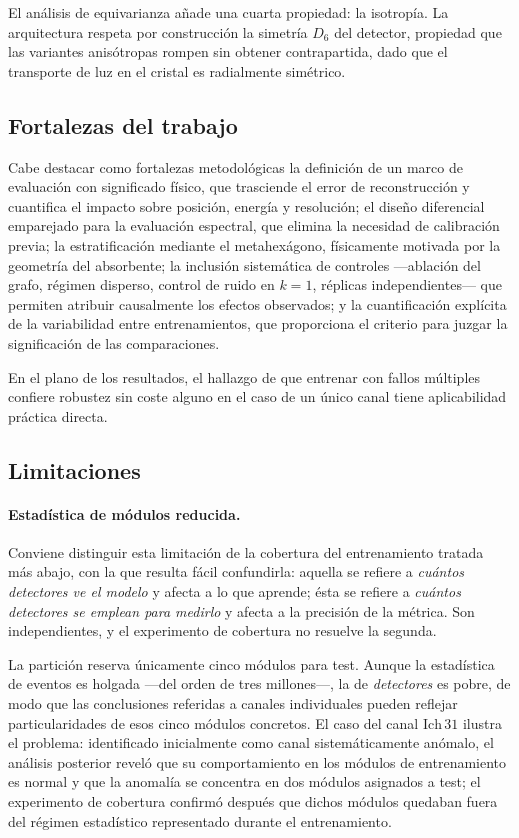 El análisis de equivarianza añade una cuarta propiedad: la isotropía. La arquitectura respeta por
construcción la simetría $D_6$ del detector, propiedad que las variantes anisótropas rompen sin
obtener contrapartida, dado que el transporte de luz en el cristal es radialmente simétrico.

\subsection{Fortalezas del trabajo}

Cabe destacar como fortalezas metodológicas la definición de un marco de evaluación con significado
físico, que trasciende el error de reconstrucción y cuantifica el impacto sobre posición, energía y
resolución; el diseño diferencial emparejado para la evaluación espectral, que elimina la necesidad
de calibración previa; la estratificación mediante el metahexágono, físicamente motivada por la
geometría del absorbente; la inclusión sistemática de controles ---ablación del grafo, régimen
disperso, control de ruido en $k=1$, réplicas independientes--- que permiten atribuir causalmente los
efectos observados; y la cuantificación explícita de la variabilidad entre entrenamientos, que
proporciona el criterio para juzgar la significación de las comparaciones.

En el plano de los resultados, el hallazgo de que entrenar con fallos múltiples confiere robustez
sin coste alguno en el caso de un único canal tiene aplicabilidad práctica directa.

\subsection{Limitaciones}

\paragraph{Estadística de módulos reducida.} Conviene distinguir esta limitación de la cobertura del
entrenamiento tratada más abajo, con la que resulta fácil confundirla: aquella se refiere a
\emph{cuántos detectores ve el modelo} y afecta a lo que aprende; ésta se refiere a \emph{cuántos
detectores se emplean para medirlo} y afecta a la precisión de la métrica. Son independientes, y el
experimento de cobertura no resuelve la segunda.

La partición reserva únicamente cinco módulos para test. Aunque la estadística de eventos es holgada
---del orden de tres millones---, la de \emph{detectores} es pobre, de modo que las conclusiones
referidas a canales individuales pueden reflejar particularidades de esos cinco módulos concretos.
El caso del canal $\mathrm{Ich}\,31$ ilustra el problema: identificado inicialmente como canal
sistemáticamente anómalo, el análisis posterior reveló que su comportamiento en los módulos de
entrenamiento es normal y que la anomalía se concentra en dos módulos asignados a test; el
experimento de cobertura confirmó después que dichos módulos quedaban fuera del régimen estadístico
representado durante el entrenamiento.

